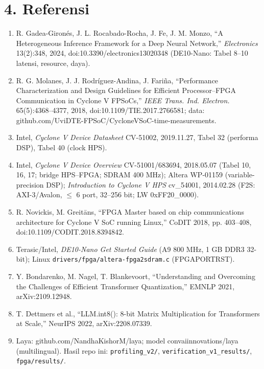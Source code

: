 \documentclass[9pt]{extarticle}
\begin{document}
\section{4. Referensi}
{\scriptsize
\begin{enumerate}[leftmargin=4.5mm]
\item R. Gadea-Giron\'es, J. L. Rocabado-Rocha, J. Fe, J. M. Monzo, ``A Heterogeneous Inference Framework for a Deep Neural Network,'' \emph{Electronics} 13(2):348, 2024, doi:10.3390/electronics13020348 (DE10-Nano: Tabel 8--10 latensi, resource, daya).
\item R. G. Molanes, J. J. Rodr\'iguez-Andina, J. Fari\~na, ``Performance Characterization and Design Guidelines for Efficient Processor--FPGA Communication in Cyclone V FPSoCs,'' \emph{IEEE Trans. Ind. Electron.} 65(5):4368--4377, 2018, doi:10.1109/TIE.2017.2766581; data: github.com/UviDTE-FPSoC/CycloneVSoC-time-measurements.
\item Intel, \emph{Cyclone V Device Datasheet} CV-51002, 2019.11.27, Tabel 32 (performa DSP), Tabel 40 (clock HPS).
\item Intel, \emph{Cyclone V Device Overview} CV-51001/683694, 2018.05.07 (Tabel 10, 16, 17; bridge HPS--FPGA; SDRAM 400 MHz); Altera WP-01159 (variable-precision DSP); \emph{Introduction to Cyclone V HPS} cv\_54001, 2014.02.28 (F2S: AXI-3/Avalon, $\le$ 6 port, 32--256 bit; LW 0xFF20\_0000).
\item R. Novickis, M. Greit\=ans, ``FPGA Master based on chip communications architecture for Cyclone V SoC running Linux,'' CoDIT 2018, pp. 403--408, doi:10.1109/CODIT.2018.8394842.
\item Terasic/Intel, \emph{DE10-Nano Get Started Guide} (A9 800 MHz, 1 GB DDR3 32-bit); Linux \texttt{drivers/fpga/altera-fpga2sdram.c} (FPGAPORTRST).
\item Y. Bondarenko, M. Nagel, T. Blankevoort, ``Understanding and Overcoming the Challenges of Efficient Transformer Quantization,'' EMNLP 2021, arXiv:2109.12948.
\item T. Dettmers et al., ``LLM.int8(): 8-bit Matrix Multiplication for Transformers at Scale,'' NeurIPS 2022, arXiv:2208.07339.
\item Laya: github.com/NandhaKishorM/laya; model convaiinnovations/laya (multilingual). Hasil repo ini: \texttt{profiling\_v2/}, \texttt{verification\_v1\_results/}, \texttt{fpga/results/}.
\end{enumerate}}

\end{document}
